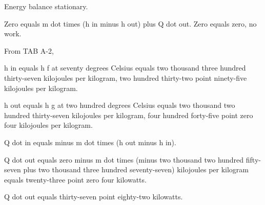 Energy balance stationary.

Zero equals m dot times (h in minus h out) plus Q dot out. Zero equals zero, no work. 

From TAB A-2, 

h in equals h f at seventy degrees Celsius equals two thousand three hundred thirty-seven kilojoules per kilogram, two hundred thirty-two point ninety-five kilojoules per kilogram. 

h out equals h g at two hundred degrees Celsius equals two thousand two hundred thirty-seven kilojoules per kilogram, four hundred forty-five point zero four kilojoules per kilogram.

Q dot in equals minus m dot times (h out minus h in). 

Q dot out equals zero minus m dot times (minus two thousand two hundred fifty-seven plus two thousand three hundred seventy-seven) kilojoules per kilogram equals twenty-three point zero four kilowatts.

Q dot out equals thirty-seven point eighty-two kilowatts.